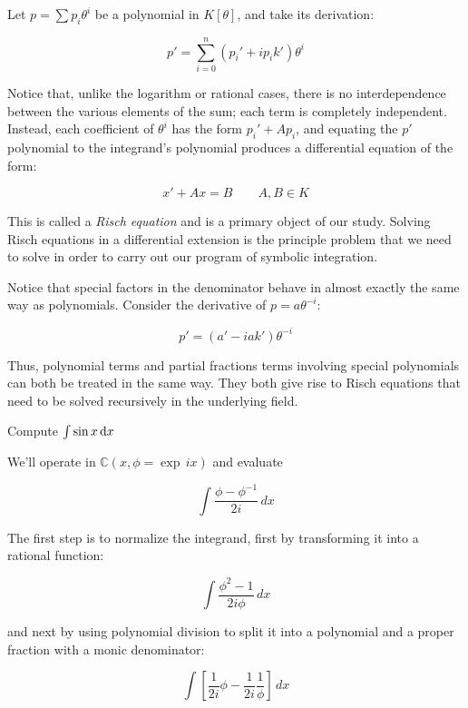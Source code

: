\begin{comment}

t=tan x
t^2+1 = tan^2 x + 1 = sec^2 x
d(t^2+1) = 2tdt = 2 tan x sec^2 x

dt/dx = sec^2 x = (1 + tan^2 x)
Dt = t^2 + 1
D(t^2+1) = 2t(t^2+1)

\end{comment}

Let $p=\sum p_i \theta^i$ be a polynomial in $K[\theta]$,
and take its derivation:

$$p' = \sum_{i=0}^n (p_i' + i p_i k') \theta^i$$

Notice that, unlike the logarithm or rational cases, there is no
interdependence between the various elements of the sum; each term is
completely independent.  Instead, each coefficient of $\theta^i$ has
the form $p_i' + A p_i$, and equating the $p'$ polynomial to the
integrand's polynomial produces a differential equation of the form:

$$x' + A x = B \qquad A,B \in K$$

This is called a {\it Risch equation} and is a primary object of our
study.  Solving Risch equations in a differential extension is the
principle problem that we need to solve in order to carry out our
program of symbolic integration.

Notice that special factors in the denominator behave in almost
exactly the same way as polynomials.  Consider the derivative of
$p=a \theta^{-i}$:

$$p' = (a' - i a k') \theta^{-i}$$

Thus, polynomial terms and partial fractions terms involving special
polynomials can both be treated in the same way.  They both give rise
to Risch equations that need to be solved recursively in the underlying
field.

\vfil\eject

\example Compute $\int \sin x \, {\rm d}x$

We'll operate in ${\mathbb C}(x, \phi = \exp \,ix)$ and evaluate

$$\int \frac{\phi - \phi^{-1}}{2i} \,dx$$

The first step is to normalize the integrand, first by transforming it
into a rational function:

$$\int \frac{\phi^2 - 1}{2i \phi} \,dx $$

and next by using polynomial division to split it into a polynomial
and a proper fraction with a monic denominator:

$$\int \left[ \frac{1}{2i} \phi - \frac{1}{2i} \frac{1}{\phi} \right] \,dx $$


